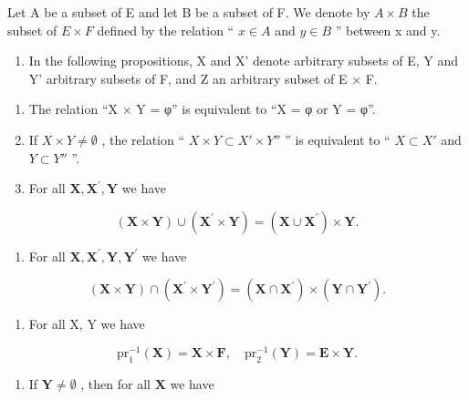 Let A be a subset of E and let B be a subset of F. We denote by \(A \times B\) the subset of \(E \times F\) defined by the relation `` \(x \in A\) and \(y \in B\) '' between x and y.

\begin{enumerate}
\def\labelenumi{\arabic{enumi}.}
\setcounter{enumi}{2}
\tightlist
\item
  In the following propositions, X and X' denote arbitrary subsets of E, Y and Y' arbitrary subsets of F, and Z an arbitrary subset of E × F.
\end{enumerate}

\begin{enumerate}
\def\labelenumi{(\alph{enumi})}
\item
  The relation ``X × Y = φ'' is equivalent to ``X = φ or Y = φ''.
\item
  If \(X \times Y \neq \emptyset\) , the relation `` \(X \times Y \subset X' \times Y''\) '' is equivalent to `` \(X \subset X'\) and \(Y \subset Y''\) ''.
\item
  For all \(\mathbf{X},\mathbf{X}^{\prime},\mathbf{Y}\) we have
\end{enumerate}

\[
(\mathbf {X} \times \mathbf {Y}) \cup (\mathbf {X} ^ {\prime} \times \mathbf {Y}) = (\mathbf {X} \cup \mathbf {X} ^ {\prime}) \times \mathbf {Y}.\tag{22}
\]

\begin{enumerate}
\def\labelenumi{(\alph{enumi})}
\setcounter{enumi}{3}
\tightlist
\item
  For all \(\mathbf{X},\mathbf{X}^{\prime},\mathbf{Y},\mathbf{Y}^{\prime}\) we have
\end{enumerate}

\[
(\mathbf {X} \times \mathbf {Y}) \cap (\mathbf {X} ^ {\prime} \times \mathbf {Y} ^ {\prime}) = (\mathbf {X} \cap \mathbf {X} ^ {\prime}) \times (\mathbf {Y} \cap \mathbf {Y} ^ {\prime}).
\]

\begin{enumerate}
\def\labelenumi{(\alph{enumi})}
\setcounter{enumi}{4}
\tightlist
\item
  For all X, Y we have
\end{enumerate}

\[
\mathrm{pr} _ {1} ^ {- 1} (\mathbf {X}) = \mathbf {X} \times \mathbf {F}, \quad \mathrm{pr} _ {2} ^ {- 1} (\mathbf {Y}) = \mathbf {E} \times \mathbf {Y}.\tag{24}
\]

\begin{enumerate}
\def\labelenumi{(\alph{enumi})}
\setcounter{enumi}{5}
\tightlist
\item
  If \(\mathbf{Y} \neq \emptyset\) , then for all \(\mathbf{X}\) we have
\end{enumerate}

